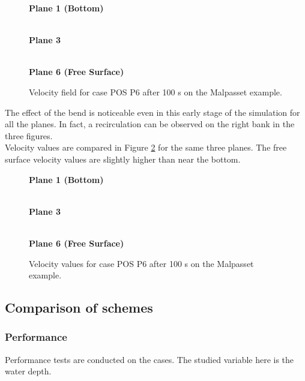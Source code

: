 \begin{figure}[H]
  \centering
  \textbf{Plane 1 (Bottom)}\par\medskip
  \\
  \textbf{Plane 3}\par\medskip
  \\
  \textbf{Plane 6 (Free Surface)}\par\medskip
  \caption{Velocity field for case POS P6 after 100 s on the Malpasset example.}\label{fig:malpasset:velocityFieldMURD}
\end{figure}

The effect of the bend is noticeable even in this early stage of the simulation for all the planes.
In fact, a recirculation can be observed on the right bank in the three figures. \\

Velocity values are compared in Figure \ref{fig:malpasset:velocityMap} for the same three planes. The free surface velocity values are slightly higher than near the bottom.

\begin{figure}[H]
  \centering
  \hspace{-1.cm}\textbf{Plane 1 (Bottom)}\par\medskip
  \\
  \hspace{-1.cm}\textbf{Plane 3}\par\medskip
  \\
  \hspace{-1.cm}\textbf{Plane 6 (Free Surface)}\par\medskip
  \caption{Velocity values for case POS P6 after 100 s on the Malpasset example.}\label{fig:malpasset:velocityMap}
\end{figure}

\subsection{Comparison of schemes}
\subsubsection*{Performance}
Performance tests are conducted on the cases. The studied variable here is the water depth.\\

